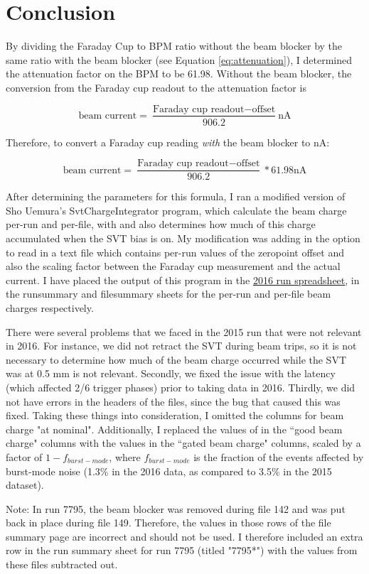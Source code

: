 \documentclass[11pt]{article}
\begin{document}
\section{Conclusion}
By dividing the Faraday Cup to BPM ratio without the beam blocker by the same ratio with the beam blocker (see Equation \ref{eq:attenuation}), I determined the attenuation factor on the BPM to be 61.98.  Without the beam blocker, the conversion from the Faraday cup readout to the attenuation factor is 

\begin{equation}\label{eq:without_blocker}
\textrm{beam current} = \frac{\textrm{Faraday cup readout}-\textrm{offset}}{906.2} \textrm{nA}
\end{equation}

Therefore, to convert a Faraday cup reading \textit{with} the beam blocker to nA:

\begin{equation}\label{eq:with_blocker}
\textrm{beam current} = \frac{\textrm{Faraday cup readout}-\textrm{offset}}{906.2}*61.98 \textrm{nA}
\end{equation} 

After determining the parameters for this formula, I ran a modified version of Sho Uemura's SvtChargeIntegrator program, which calculate the beam charge per-run and per-file, with and also determines how much of this charge accumulated when the  SVT bias is on.   My modification was adding in the option to read in a text file which contains per-run values of the zeropoint offset and also the scaling factor between the Faraday cup measurement and the actual current.  I have placed the output of this program in the \href{https://docs.google.com/spreadsheets/d/1X_TfOQyQBv9Ja1IQ5LYImk0sd00eN-d4zzkCwn-CSUM/edit#gid=43855609}{\underline{2016 run spreadsheet}}, in the runsummary and filesummary sheets for the per-run and per-file beam charges respectively.  

There were several problems that we faced in the 2015 run that were not relevant in 2016.  For instance, we did not retract the SVT during beam trips, so it is not necessary to determine how much of the beam charge occurred while the SVT was at 0.5 mm is not relevant.  Secondly, we fixed the issue with the latency (which affected 2/6 trigger phases) prior to taking data in 2016.  Thirdly, we did not have errors in the headers of the files, since the bug that caused this was fixed.   Taking these things into consideration, I omitted the columns for beam charge "at nominal".   Additionally, I replaced the values of in the ``good beam charge" columns with the values in the  ``gated beam charge" columns, scaled by a factor of $1-f_{burst-mode}$, where $f_{burst-mode}$ is the fraction of the events affected by burst-mode noise (1.3\% in the 2016 data, as compared to 3.5\% in the 2015 dataset).  

Note: In run 7795, the beam blocker was removed during file 142 and was put back in place during file 149.  Therefore, the values in those rows of the file summary page are incorrect and should not be used.  I therefore included an extra row in the run summary sheet for run 7795 (titled "7795*") with the values from these files subtracted out.  
\end{document}
